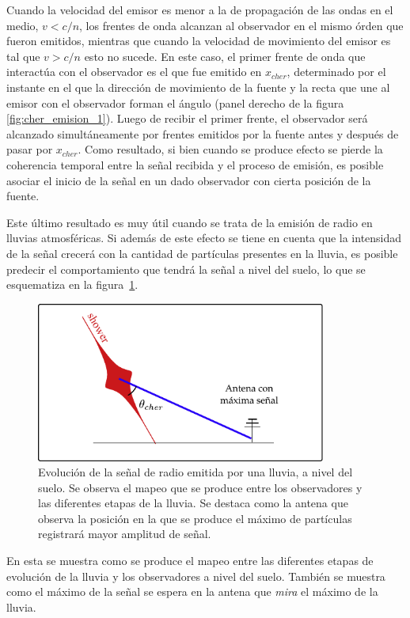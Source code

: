 	Cuando la velocidad del emisor es menor a la de propagaci\'on de las ondas en el medio, $v<c/n$, los frentes de onda alcanzan al observador en el mismo \'orden que fueron emitidos, mientras que cuando la velocidad de movimiento del emisor es tal que $v>c/n$ esto no sucede.
	En este caso, el primer frente de onda que interact\'ua con el observador es el que fue emitido en $x_{cher}$, determinado por el instante en el que la direcci\'on de movimiento de la fuente y la recta que une al emisor con el observador forman el \'angulo \cher{} (panel derecho de la figura \ref{fig:cher_emision_1}).
	Luego de recibir el primer frente, el observador ser\'a alcanzado simult\'aneamente por frentes emitidos por la fuente antes y despu\'es de pasar por $x_{cher}$.
	Como resultado, si bien cuando se produce efecto \cher{} se pierde la coherencia temporal entre la se\~nal recibida y el proceso de emisi\'on, es posible asociar el inicio de la se\~nal en un dado observador con cierta posici\'on de la fuente.
	
	Este \'ultimo resultado es muy \'util cuando se trata de la emisi\'on de radio en lluvias atmosf\'ericas.
	Si adem\'as de este efecto se tiene en cuenta que la intensidad de la se\~nal crecer\'a con la cantidad de part\'iculas presentes en la lluvia, es posible predecir el comportamiento que tendr\'a la se\~nal a nivel del suelo, lo que se esquematiza en la figura~\ref{fig:cher_emision_2}.
	\begin{figure}[ht!]
		\centering
		\includegraphics[width=0.85\textwidth]{fig/EASRadio/cono}
		\caption{\label{fig:cher_emision_2} Evoluci\'on de la se\~nal de radio emitida por una lluvia, a nivel del suelo. Se observa el mapeo que se produce entre los observadores y las diferentes etapas de la lluvia. Se destaca como la antena que observa la posici\'on en la que se produce el m\'aximo de part\'iculas registrar\'a mayor amplitud de se\~nal.}
	\end{figure}
	En esta se muestra como se produce el mapeo entre las diferentes etapas de evoluci\'on de la lluvia y los observadores a nivel del suelo.
	Tambi\'en se muestra como el m\'aximo de la se\~nal se espera en la antena que \emph{mira} el m\'aximo de la lluvia.
	
